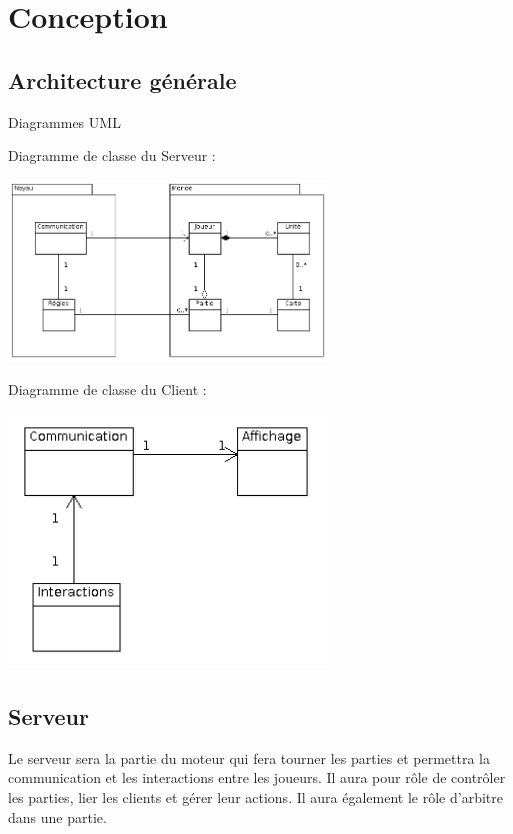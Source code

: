 \documentclass[a4paper,10pt]{report}
\begin{document}
  \chapter{Conception}

    \section{Architecture générale}

      Diagrammes UML
      
      Diagramme de classe du Serveur : 
      
      \includegraphics[width=320px]{diagrammes/moteur_serveur_classes.png}
      
      Diagramme de classe du Client : 
      
      \includegraphics[width=320px]{diagrammes/moteur_client_classes.png}


    \section{Serveur}

      Le serveur sera la partie du moteur qui fera tourner les parties et permettra la communication et les interactions entre les joueurs. Il aura pour rôle de contrôler les parties, lier les clients et gérer leur actions. Il aura également le rôle d'arbitre dans une partie. 
\end{document}

